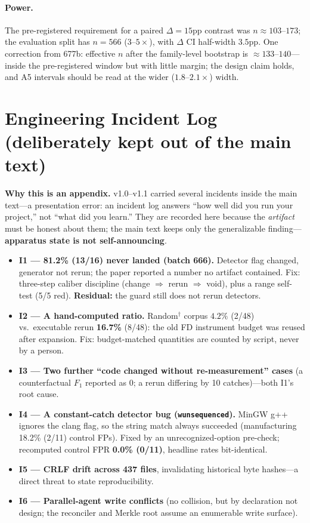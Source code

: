 \paragraph{Power.} The pre-registered requirement for a paired $\Delta{=}15$pp contrast was
$n\approx103$--$173$; the evaluation split has \textbf{$n{=}566$} ($3$--$5\times$), with $\Delta$
CI half-width $3.5$pp. One correction from 677b: effective $n$ after the family-level bootstrap is
$\approx133$--$140$---inside the pre-registered window but with little margin; the design claim
holds, and A5 intervals should be read at the wider ($1.8$--$2.1\times$) width.

\section{Engineering Incident Log (deliberately kept out of the main text)}
\label{app:incidents}
\textbf{Why this is an appendix.} v1.0--v1.1 carried several incidents inside the main text---a
presentation error: an incident log answers ``how well did you run your project,'' not ``what did you
learn.'' They are recorded here because the \emph{artifact} must be honest about them; the main text
keeps only the generalizable finding---\textbf{apparatus state is not self-announcing}.

\begin{itemize}
\item \textbf{I1 --- 81.2\% (13/16) never landed (batch 666).} Detector flag changed, generator not
rerun; the paper reported a number no artifact contained. Fix: three-step caliber discipline
(change $\Rightarrow$ rerun $\Rightarrow$ void), plus a range self-test (5/5 red). \textbf{Residual:}
the guard still does not rerun detectors.
\item \textbf{I2 --- A hand-computed ratio.} Random$^{\dagger}$ corpus $4.2\%$ (2/48) vs.\ executable
rerun \textbf{16.7\%} (8/48): the old FD instrument budget was reused after expansion. Fix:
budget-matched quantities are counted by script, never by a person.
\item \textbf{I3 --- Two further ``code changed without re-measurement'' cases} (a counterfactual
$F_1$ reported as 0; a rerun differing by 10 catches)---both I1's root cause.
\item \textbf{I4 --- A constant-catch detector bug (\texttt{wunsequenced}).} MinGW g++ ignores the
clang flag, so the string match always succeeded (manufacturing 18.2\% (2/11) control FPs). Fixed by
an unrecognized-option pre-check; recomputed control FPR \textbf{0.0\% (0/11)}, headline rates
bit-identical.
\item \textbf{I5 --- CRLF drift across 437 files}, invalidating historical byte hashes---a direct
threat to state reproducibility.
\item \textbf{I6 --- Parallel-agent write conflicts} (no collision, but by declaration not design;
the reconciler and Merkle root assume an enumerable write surface).
\end{itemize}

